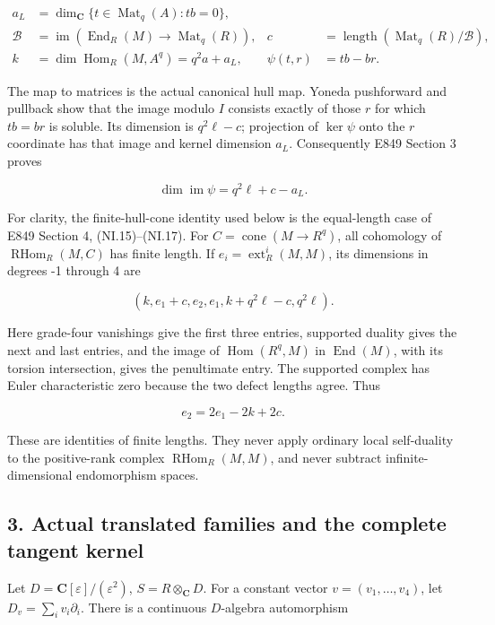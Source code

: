 \[
 \begin{aligned}
 a_L&=\dim_{\mathbf C}\{t\in\operatorname{Mat}_q(A):tb=0\},\\
 \mathcal B&=\operatorname{im}
       (\operatorname{End}_R(M)\longrightarrow\operatorname{Mat}_q(R)),
       &c&=\operatorname{length}(\operatorname{Mat}_q(R)/\mathcal B),\\
 k&=\dim\operatorname{Hom}_R(M,A^q)=q^2a+a_L,
       &\psi(t,r)&=tb-br.
 \end{aligned}
 \tag{TR.9}
\]

The map to matrices is the actual canonical hull map. Yoneda pushforward
and pullback show that the image modulo \(I\) consists exactly of those \(r\)
for which \(tb=br\) is soluble. Its dimension is \(q^2\ell-c\); projection of
\(\ker\psi\) onto the \(r\) coordinate has that image and kernel dimension \(a_L\).
Consequently E849 Section 3 proves

\[
                  \dim\operatorname{im}\psi=q^2\ell+c-a_L.
 \tag{TR.10}
\]

For clarity, the finite-hull-cone identity used below is the equal-length
case of E849 Section 4, (NI.15)--(NI.17). For \(C=\operatorname{cone}(M\to R^q)\),
all cohomology of \(\operatorname{RHom}_R(M,C)\) has finite length. If \(e_i=\operatorname{ext}^i_R(M,M)\),
its dimensions in degrees -1 through 4 are

\[
  (k, e_1+c, e_2, e_1, k+q^2\ell-c, q^2\ell).
 \tag{TR.11}
\]

Here grade-four vanishings give the first three entries, supported
duality gives the next and last entries, and the image of \(\operatorname{Hom}(R^q,M)\)
in \(\operatorname{End}(M)\), with its torsion intersection, gives the penultimate entry.
The supported complex has Euler characteristic zero because the two
defect lengths agree. Thus

\[
                  e_2=2e_1-2k+2c.
 \tag{TR.12}
\]

These are identities of finite lengths. They never apply ordinary local
self-duality to the positive-rank complex \(\operatorname{RHom}_R(M,M)\), and never
subtract infinite-dimensional endomorphism spaces.

\subsection{3. Actual translated families and the complete tangent kernel}\label{SF-E850:s3}

Let \(D=\mathbf C[\varepsilon]/(\varepsilon^2)\), \(S=R\otimes_{\mathbf C}D\). For a constant vector
\(v=(v_1,\ldots,v_4)\), let \(D_v=\sum_i v_i\partial_i\). There is a continuous
\(D\)-algebra automorphism


